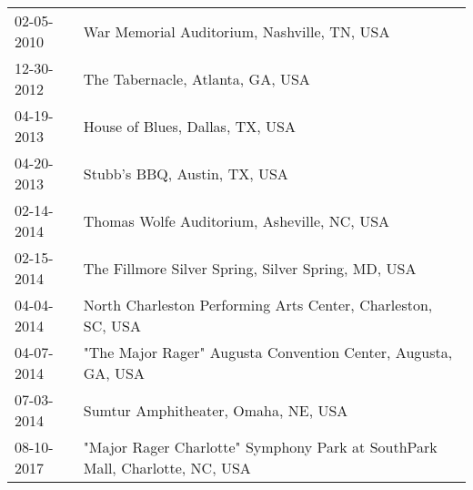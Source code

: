 \begin{supertabular}{ll}
 02-05-2010 &                                  War Memorial Auditorium, Nashville, TN, USA \\
 12-30-2012 &                                             The Tabernacle, Atlanta, GA, USA \\
 04-19-2013 &                                              House of Blues, Dallas, TX, USA \\
 04-20-2013 &                                                 Stubb's BBQ, Austin, TX, USA \\
 02-14-2014 &                                  Thomas Wolfe Auditorium, Asheville, NC, USA \\
 02-15-2014 &                           The Fillmore Silver Spring, Silver Spring, MD, USA \\
 04-04-2014 &                 North Charleston Performing Arts Center, Charleston, SC, USA \\
 04-07-2014 &                "The Major Rager" Augusta Convention Center, Augusta, GA, USA \\
 07-03-2014 &                                          Sumtur Amphitheater, Omaha, NE, USA \\
 08-10-2017 &  "Major Rager Charlotte" Symphony Park at SouthPark Mall, Charlotte, NC, USA \\
\end{supertabular}
